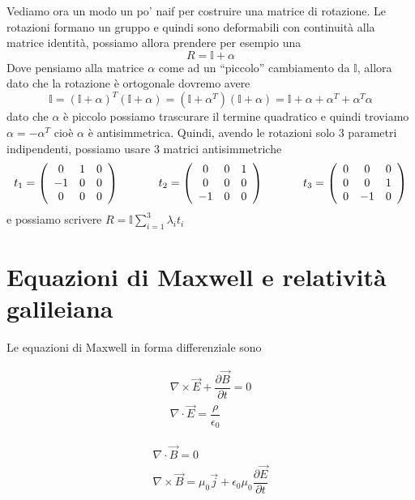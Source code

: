 \documentclass[12pt,a4paper,titlepage, twoside, openright]{book}
\numberwithin{equation}{chapter}
\begin{document}
Vediamo ora un modo un po' naif per costruire una matrice di rotazione.
Le rotazioni formano un gruppo e quindi sono deformabili con continuità alla matrice identità, possiamo allora prendere per esempio una
\[
R=\mathbb{I}+\alpha
\]
Dove pensiamo alla matrice $\alpha$ come ad un ``piccolo'' cambiamento da $\mathbb{I}$, allora dato che la rotazione è ortogonale dovremo avere
\[
\mathbb{I}=(\mathbb{I}+\alpha)^T (\mathbb{I}+\alpha)=(\mathbb{I}+\alpha^T)(\mathbb{I}+\alpha)= \mathbb{I}+\alpha+\alpha^T+\alpha^T\alpha
\]
dato che $\alpha$ è piccolo possiamo trascurare il termine quadratico e quindi troviamo $\alpha=-\alpha^T$ cioè $\alpha$ è antisimmetrica.
Quindi, avendo le rotazioni solo $3$ parametri indipendenti, possiamo usare $3$ matrici antisimmetriche
\[
t_1=\left(\begin{array}{ccc}
0 & 1 &0 \\ -1 & 0 & 0 \\ 0 & 0 & 0
\end{array}\right)\hspace{0.1\linewidth}
t_2=\left(\begin{array}{ccc}
0 & 0 & 1 \\ 0 & 0 & 0 \\ -1 & 0 & 0
\end{array}\right)\hspace{0.1\linewidth}
t_3=\left(\begin{array}{ccc}
0 & 0 & 0 \\ 0 & 0 & 1 \\ 0 & -1 & 0
\end{array}\right)
\]
e possiamo scrivere
$R=\mathbb{I} \sum_{i=1}^3 \lambda_i t_i$

\section{Equazioni di Maxwell e relatività galileiana}

Le equazioni di Maxwell in forma differenziale sono

\begin{minipage}[H]{0.45\linewidth}
\begin{align}
\nabla\times\vec{E}+\dfrac{\partial \vec{B}}{\partial t}=0  \\
\nabla \cdot \vec{E}=\dfrac{\rho}{\epsilon_0} 
\end{align}
\end{minipage}
\begin{minipage}[H]{0.45\linewidth}
\begin{align}
\nabla \cdot \vec{B}= 0 \\
\nabla\times\vec{B}=\mu_0\vec{j}+\epsilon_0\mu_0\dfrac{\partial \vec{E}}{\partial t}
\end{align}
\end{minipage}
\end{document}
